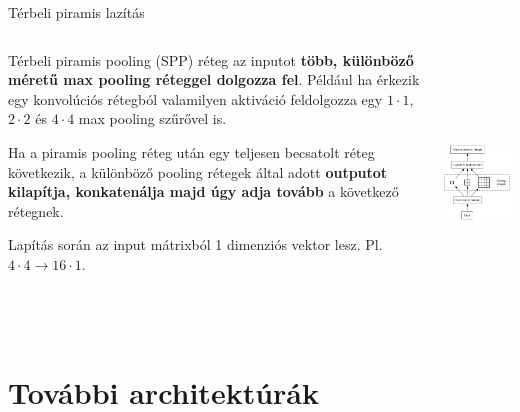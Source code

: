 \documentclass[english, aspectratio=169]{beamer}
\makeatletter
\let\origtableofcontents=\tableofcontents
\def\tableofcontents{\@ifnextchar[{\origtableofcontents}{\gobbletableofcontents}}
\def\gobbletableofcontents#1{\origtableofcontents}
\makeatother
\begin{document}
\begin{frame}{Térbeli piramis lazítás}
\begin{columns}
\begin{column}{.5\textwidth}
Térbeli piramis pooling (SPP) réteg az inputot \textbf{több, különböző méretű max pooling réteggel dolgozza fel}. Például ha érkezik egy konvolúciós rétegból valamilyen aktiváció feldolgozza egy $1 \cdot 1$, $2 \cdot 2$ és $4 \cdot 4$ max pooling szűrővel is.\par\smallskip
Ha a piramis pooling réteg után egy teljesen becsatolt réteg következik, a különböző pooling rétegek által adott \textbf{outputot kilapítja, konkatenálja majd úgy adja tovább} a következő rétegnek.\par\smallskip
Lapítás során az input mátrixból 1 dimenziós vektor lesz. Pl. $4 \cdot 4 \rightarrow 16 \cdot 1$.
\end{column}
\begin{column}{.5\textwidth}
\begin{center}
\includegraphics[height=7cm, keepaspectratio]{graphs/od_4.png}
\end{center}
\end{column}
\end{columns}
\end{frame}

\section{További architektúrák}

\begin{frame}
\tableofcontents[currentsection]
\end{frame}
\end{document}
